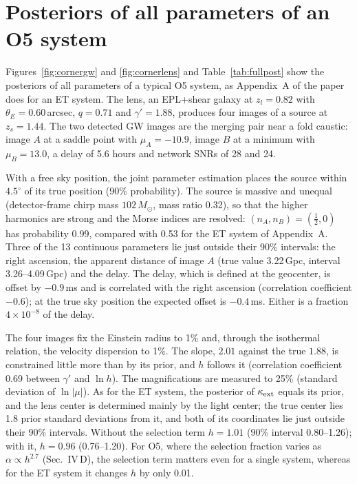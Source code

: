 \documentclass[aps,prd,onecolumn,nofootinbib,floatfix]{revtex4-2}
\newcommand{\degr}{^\circ}
\begin{document}
\begin{table}[h]
\caption{Fraction of systems whose 90\% interval contains the true value. GW parameters: joint parameter estimation (ET with the sky position of the host, O5 with a free sky position); for the arrival time, 51 O5 systems (the others did not store it). GW+EM: model of the simulated family, with the selection term for $h$.\\ $^a$ Median $\pm1.645$ standard deviations, for the 15 (ET) and 14 (O5) EPL+shear systems.}
\label{tab:coverage}

\end{table}

\section{Posteriors of all parameters of an O5 system}
\label{sec:o5}
Figures~\ref{fig:cornergw} and \ref{fig:cornerlens} and Table~\ref{tab:fullpost} show the posteriors of all parameters of a typical O5 system, as Appendix~A of the paper does for an ET system. The lens, an EPL+shear galaxy at $z_l=0.82$ with $\theta_E=0.60$\,arcsec, $q=0.71$ and $\gamma'=1.88$, produces four images of a source at $z_s=1.44$. The two detected GW images are the merging pair near a fold caustic: image $A$ at a saddle point with $\mu_A=-10.9$, image $B$ at a minimum with $\mu_B=13.0$, a delay of 5.6 hours and network SNRs of 28 and 24.

With a free sky position, the joint parameter estimation places the source within $4.5\degr$ of its true position (90\% probability). The source is massive and unequal (detector-frame chirp mass $102\,M_\odot$, mass ratio 0.32), so that the higher harmonics are strong and the Morse indices are resolved: $(n_A,n_B)=(\frac12,0)$ has probability 0.99, compared with 0.53 for the ET system of Appendix~A. Three of the 13 continuous parameters lie just outside their 90\% intervals: the right ascension, the apparent distance of image $A$ (true value 3.22\,Gpc, interval 3.26--4.09\,Gpc) and the delay. The delay, which is defined at the geocenter, is offset by $-0.9$\,ms and is correlated with the right ascension (correlation coefficient $-0.6$); at the true sky position the expected offset is $-0.4$\,ms. Either is a fraction $4\times10^{-8}$ of the delay.

The four images fix the Einstein radius to 1\% and, through the isothermal relation, the velocity dispersion to 1\%. The slope, $2.01$ against the true $1.88$, is constrained little more than by its prior, and $h$ follows it (correlation coefficient 0.69 between $\gamma'$ and $\ln h$). The magnifications are measured to 25\% (standard deviation of $\ln|\mu|$). As for the ET system, the posterior of $\kappa_{\rm ext}$ equals its prior, and the lens center is determined mainly by the light center; the true center lies 1.8 prior standard deviations from it, and both of its coordinates lie just outside their 90\% intervals. Without the selection term $h=1.01$ (90\% interval 0.80--1.26); with it, $h=0.96$ (0.76--1.20). For O5, where the selection fraction varies as $\alpha\propto h^{2.7}$ (Sec.~IV\,D), the selection term matters even for a single system, whereas for the ET system it changes $h$ by only 0.01.
\end{document}
